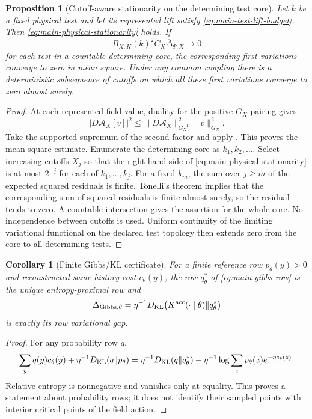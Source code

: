\documentclass[11pt]{article}
\numberwithin{equation}{section}
\newtheorem{proposition}[proposition]{Proposition}
\newtheorem{corollary}[corollary]{Corollary}
\theoremstyle{definition}
\theoremstyle{remark}
\begin{document}
\begin{proposition}[Cutoff-aware stationarity on the determining test core]
\label{prop:supp-physical-test-stationarity}
Let $k$ be a fixed physical test and let its represented lift satisfy
\eqref{eq:main-test-lift-budget}.  Then
\eqref{eq:main-physical-stationarity} holds.  If
\begin{equation}
 B_{X,K}(k)^2C_X\overline\Delta_{\Psi,X}\longrightarrow0
 \label{eq:supp-scaled-test-gap}
\end{equation}
for each test in a countable determining core, the corresponding first
variations converge to zero in mean square.  Under any common coupling there
is a deterministic subsequence of cutoffs on which all these first variations
converge to zero almost surely.
\end{proposition}
\begin{proof}
At each represented field value, duality for the positive $G_X$ pairing gives
\[
 |D\mathcal A_X[v]|^2
 \le\|D\mathcal A_X\|_{G_X^{-1}}^2\|v\|_{G_X}^2.
\]
Take the supported supremum of the second factor and apply
.  This proves the mean-square estimate.
Enumerate the determining core as $k_1,k_2,\ldots$.  Select increasing cutoffs
$X_j$ so that the right-hand side of
\eqref{eq:main-physical-stationarity} is at most $2^{-j}$ for each of
$k_1,\ldots,k_j$.  For a fixed $k_m$, the sum over $j\ge m$ of the expected
squared residuals is finite.  Tonelli's theorem implies that the corresponding
sum of squared residuals is finite almost surely, so the residual tends to
zero.  A countable intersection gives the assertion for the whole core.
No independence between cutoffs is used.  Uniform continuity of the limiting
variational functional on the declared test topology then extends zero from
the core to all determining tests.
\end{proof}

\begin{corollary}[Finite Gibbs/KL certificate]
\label{cor:supp-gibbs-gap}
For a finite reference row $p_\theta(y)>0$ and reconstructed same-history cost
$c_\theta(y)$, the row $q_\theta^*$ of \eqref{eq:main-gibbs-row} is the unique
entropy-proximal row and
\begin{equation}
 \Delta_{{\rm Gibbs},\theta}
       =\eta^{-1}D_{\rm KL}
       \bigl(K^{\rm acc}(\cdot\mid\theta)\Vert q_\theta^*\bigr)
 \label{eq:supp-gibbs-gap}
\end{equation}
is exactly its row variational gap.
\end{corollary}
\begin{proof}
For any probability row $q$,
\[
 \sum_yq(y)c_\theta(y)+\eta^{-1}D_{\rm KL}(q\Vert p_\theta)
 =\eta^{-1}D_{\rm KL}(q\Vert q_\theta^*)
       -\eta^{-1}\log\sum_zp_\theta(z)e^{-\eta c_\theta(z)}.
\]
Relative entropy is nonnegative and vanishes only at equality.  This proves a
statement about probability rows; it does not identify their sampled points
with interior critical points of the field action.
\end{proof}
\end{document}
